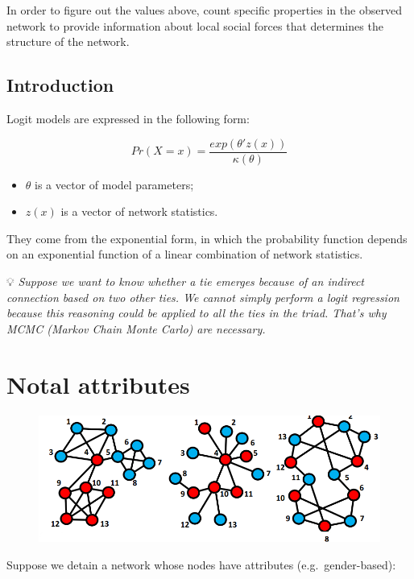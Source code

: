 \documentclass[
  notitlepage,
  onecolumn,
  openany]{book}
\providecommand{\tightlist}{%
  \setlength{\itemsep}{0pt}\setlength{\parskip}{0pt}}
\begin{document}
In order to figure out the values above, count specific properties in the observed network to provide information about local social forces that determines the structure of the network.

\hypertarget{introduction-2}{%
\subsection{Introduction}\label{introduction-2}}

Logit models are expressed in the following form:

\[
Pr(X=x) = \frac{exp(\theta'z(x))}{\kappa(\theta)}
\]

\begin{itemize}
\tightlist
\item
  \(\theta\) is a vector of model parameters;
\item
  \(z(x)\) is a vector of network statistics.
\end{itemize}

They come from the exponential form, in which the probability function depends on an exponential function of a linear combination of network statistics.

💡 \emph{Suppose we want to know whether a tie emerges because of an indirect connection based on two other ties. We cannot simply perform a logit regression because this reasoning could be applied to all the ties in the triad. That's why MCMC (Markov Chain Monte Carlo) are necessary.}

\hypertarget{notal-attributes}{%
\section{Notal attributes}\label{notal-attributes}}

\begin{figure}[h!]

{\centering \includegraphics[width=0.5\linewidth]{images/13-ERGMs/Untitled 2} 

}

\end{figure}

Suppose we detain a network whose nodes have attributes (e.g.~gender-based):
\end{document}
